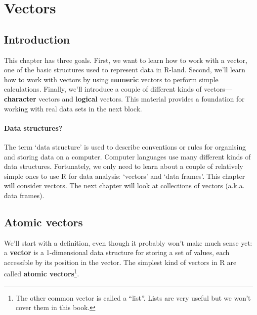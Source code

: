 \documentclass[
]{book}
\newenvironment{greybox}{
  \definecolor{shadecolor}{rgb}{0.95,0.95,0.95}  %
  \color{black}
  \begin{shaded}}
 {\end{shaded}}
\newenvironment{infobox}[1]
  {
  \begin{itemize}
  \renewcommand{\labelitemi}{
    \raisebox{-.7\height}[0pt][0pt]{
      {\setkeys{Gin}{width=3em,keepaspectratio}
        \texttt{[image: images/\#1]}}
    }
  }
  \setlength{\fboxsep}{1em}
  \begin{greybox}
  \item
  }
  {
  \end{greybox}
  \end{itemize}
  }
\begin{document}
\hypertarget{vectors}{%
\chapter{Vectors}\label{vectors}}

\hypertarget{introduction}{%
\section{Introduction}\label{introduction}}

This chapter has three goals. First, we want to learn how to work with a vector, one of the basic structures used to represent data in R-land. Second, we'll learn how to work with vectors by using \textbf{numeric} vectors to perform simple calculations. Finally, we'll introduce a couple of different kinds of vectors---\textbf{character} vectors and \textbf{logical} vectors. This material provides a foundation for working with real data sets in the next block.

\begin{infobox}{information}

\hypertarget{data-structures}{%
\subsubsection*{Data structures?}\label{data-structures}}

The term `data structure' is used to describe conventions or rules for organising and storing data on a computer. Computer languages use many different kinds of data structures. Fortunately, we only need to learn about a couple of relatively simple ones to use R for data analysis: `vectors' and `data frames'. This chapter will consider vectors. The next chapter will look at collections of vectors (a.k.a. data frames).

\end{infobox}

\hypertarget{atomic-vectors}{%
\section{Atomic vectors}\label{atomic-vectors}}

We'll start with a definition, even though it probably won't make much sense yet: a \textbf{vector} is a 1-dimensional data structure for storing a set of values, each accessible by its position in the vector. The simplest kind of vectors in R are called \textbf{atomic vectors}\footnote{The other common vector is called a ``list''. Lists are very useful but we won't cover them in this book.}.
\end{document}
